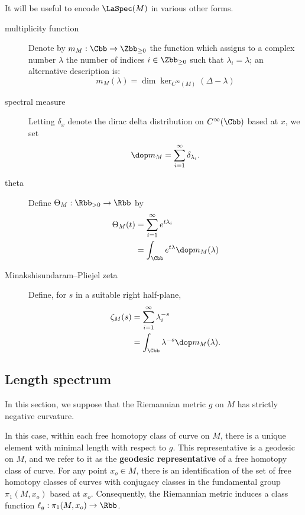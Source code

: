 It will be useful to encode $\LaSpec(M)$ in various other forms.
\begin{description}
    \item[multiplicity function] Denote by $m_M: \Cbb \to \Zbb_{\geq 0}$ the function which assigns to a complex number $\lambda$ the number of indices $i\in \Zbb_{\geq 0}$ such that $\lambda_i = \lambda$; an alternative description is:
        \[m_M(\lambda) = \dim \ker_{C^\infty(M)}( \Delta - \lambda) \]
    \item[spectral measure] Letting $\delta_x$ denote the dirac delta distribution on $C^\infty(\Cbb)$ based at $x$, we set
        \begin{align*}
            \dop m_M = \sum_{i=1}^\infty \delta_{\lambda_i}.
        \end{align*}
    \item[theta] Define $\Theta_M: \Rbb_{>0} \to \Rbb$ by
        \begin{align*}
            \Theta_M(t) & = \sum_{i=1}^\infty e^{t\lambda_i}           \\
                        & = \int_\Cbb e^{t \lambda} \dop m_M (\lambda)
        \end{align*}
    \item[Minakshisundaram--Pliejel zeta] Define, for $s$ in a suitable right half-plane,
        \begin{align*}
            \zeta_M(s) & = \sum_{i=1}^\infty \lambda_{i}^{-s}        \\
                       & = \int_\Cbb \lambda^{-s} \dop m_M(\lambda).
        \end{align*}
\end{description}
\subsection{Length spectrum}
In this section, we suppose that the Riemannian metric $g$ on $M$ has strictly negative curvature.

In this case, within each free homotopy class of curve on $M$, there is a unique element with minimal length with respect to $g$. This representative is a geodesic on $M$, and we refer to it as the \textbf{geodesic representative} of a free homotopy class of curve. For any point $x_o \in M$, there is an identification of the set of free homotopy classes of curves with conjugacy classes in the fundamental group $\pi_1(M,x_o)$ based at $x_o$. Consequently, the Riemannian metric induces a class function $\ell_g: \pi_1(M,x_o) \to \Rbb$.


